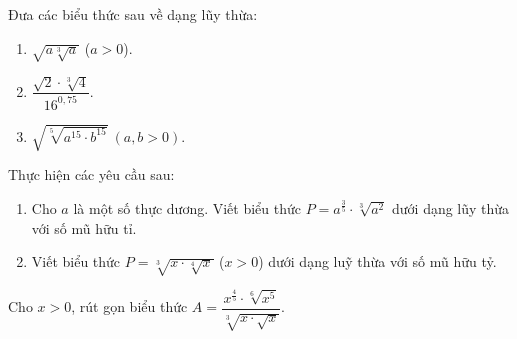 \begin{ex}%
	Đưa  các biểu thức sau về dạng lũy thừa:
	\begin{enumerate}
		\item $\sqrt{a\sqrt[3]a}$ ($a>0$). 
		\item  $\dfrac{\sqrt{2}\cdot\sqrt[3]4}{16^{0{,}75}}$.
		\item $\sqrt{\sqrt[5]{a^{15}\cdot b^{15}}}~(a,b>0)$. 
	\end{enumerate}
\end{ex}

\begin{ex}%
	Thực hiện các yêu cầu  sau:
	\begin{enumerate}
		\item Cho $a$ là một số thực dương. Viết biểu thức $P=a^{\frac{3}{5}} \cdot \sqrt[3]{a^2}$ dưới dạng lũy thừa với  số mũ hữu tỉ.
		\item Viết biểu thức $P=\sqrt[3]{x \cdot  \sqrt[4]{x}}$ ($x>0$) dưới dạng luỹ thừa với số mũ hữu tỷ.
	\end{enumerate}
\end{ex}

\begin{ex}%
	Cho $x>0$, rút gọn biểu thức $A=\dfrac{x^{\tfrac{4}{5}} \cdot \sqrt[6]{x^5}}{\sqrt[3]{x \cdot  \sqrt{x}}}$.
\end{ex}

